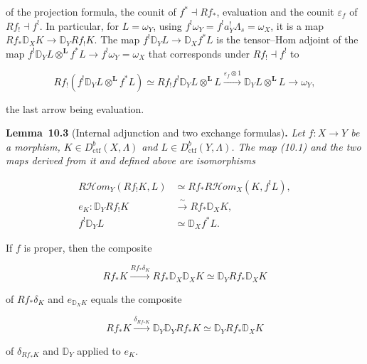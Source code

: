 \documentclass[11pt]{article}
\newenvironment{bpstatement}[2]{\par\addvspace{0.6\baselineskip}\noindent\textbf{#1}#2\textbf{.}\enspace\ignorespaces}
  {\par\addvspace{0.4\baselineskip}}
\newenvironment{bpstatementit}[2]{\begin{bpstatement}{#1}{#2}\itshape\ignorespaces}{\end{bpstatement}}
\providecommand{\cHom}{}\renewcommand{\cHom}{R\mathcal{H}\!om}
\begin{document}
of the projection formula, the counit of \(f^*\dashv Rf_*\), evaluation and the counit \(\varepsilon_f\) of \(Rf_!\dashv f^!\). In particular, for \(L=\omega_Y\), using \(f^!\omega_Y=f^!a_Y^!\Lambda_s=\omega_X\), it is a map \(Rf_*\mathbb D_XK\to\mathbb D_YRf_!K\). The map \(f^!\mathbb D_YL\to\mathbb D_Xf^*L\) is the tensor–Hom adjoint of the map \(f^!\mathbb D_YL\otimes^{\mathbf L}f^*L\to f^!\omega_Y=\omega_X\) that corresponds under \(Rf_!\dashv f^!\) to

\[
Rf_!(f^!\mathbb D_YL\otimes^{\mathbf L}f^*L)
\simeq Rf_!f^!\mathbb D_YL\otimes^{\mathbf L}L
\xrightarrow{\varepsilon_f\otimes1}\mathbb D_YL\otimes^{\mathbf L}L
\longrightarrow\omega_Y,
\]

the last arrow being evaluation.

\label{bp110}%
\begin{bpstatementit}{Lemma~10.3}{ (Internal adjunction and two exchange formulas)}
Let \(f:X\to Y\) be a morphism, \(K\in D^b_{\mathrm{ctf}}(X,\Lambda)\) and \(L\in D^b_{\mathrm{ctf}}(Y,\Lambda)\). The map (10.1) and the two maps derived from it and defined above are isomorphisms

\begin{align*}
\cHom_Y(Rf_!K,L)&\simeq
Rf_*\cHom_X(K,f^!L),\tag{10.2}\\
e_K:\mathbb D_YRf_!K&\xrightarrow{\ \sim\ } Rf_*\mathbb D_XK,
\tag{10.3}\\
f^!\mathbb D_YL&\simeq\mathbb D_Xf^*L.
\tag{10.4}\end{align*}

If \(f\) is proper, then the composite

\[
Rf_*K\xrightarrow{Rf_*\delta_K}Rf_*\mathbb D_X\mathbb D_XK
\simeq\mathbb D_YRf_*\mathbb D_XK
\]

of \(Rf_*\delta_K\) and \(e_{\mathbb D_XK}\) equals the composite

\[
Rf_*K\xrightarrow{\delta_{Rf_*K}}\mathbb D_Y\mathbb D_YRf_*K
\simeq\mathbb D_YRf_*\mathbb D_XK
\]

of \(\delta_{Rf_*K}\) and \(\mathbb D_Y\) applied to \(e_K\).
\end{bpstatementit}
\end{document}
